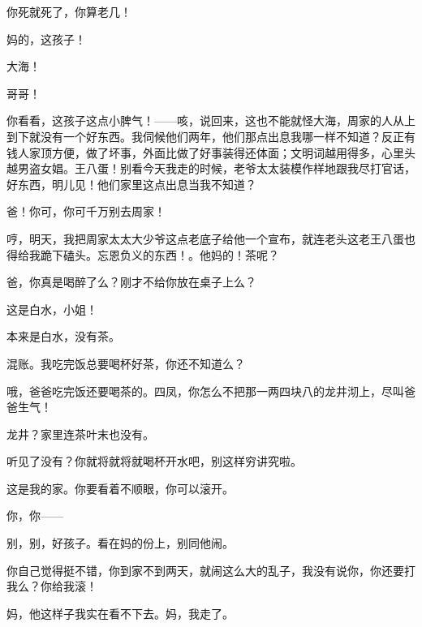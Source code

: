 你死就死了，你算老几！

妈的，这孩子！ 

大海！

哥哥！


你看看，这孩子这点小脾气！——咳，说回来，这也不能就怪大海，周家的人从上到下就没有一个好东西。我伺候他们两年，他们那点出息我哪一样不知道？反正有钱人家顶方便，做了坏事，外面比做了好事装得还体面；文明词越用得多，心里头越男盗女娼。王八蛋！别看今天我走的时候，老爷太太装模作样地跟我尽打官话，好东西，明儿见！他们家里这点出息当我不知道？

爸！你可，你可千万别去周家！

哼，明天，我把周家太太大少爷这点老底子给他一个宣布，就连老头这老王八蛋也得给我跪下磕头。忘恩负义的东西！。他妈的！茶呢？

爸，你真是喝醉了么？刚才不给你放在桌子上么？

这是白水，小姐！

本来是白水，没有茶。

混账。我吃完饭总要喝杯好茶，你还不知道么？

哦，爸爸吃完饭还要喝茶的。四凤，你怎么不把那一两四块八的龙井沏上，尽叫爸爸生气！

龙井？家里连茶叶末也没有。

听见了没有？你就将就将就喝杯开水吧，别这样穷讲究啦。

这是我的家。你要看着不顺眼，你可以滚开。

你，你——

别，别，好孩子。看在妈的份上，别同他闹。

你自己觉得挺不错，你到家不到两天，就闹这么大的乱子，我没有说你，你还要打我么？你给我滚！

妈，他这样子我实在看不下去。妈，我走了。

